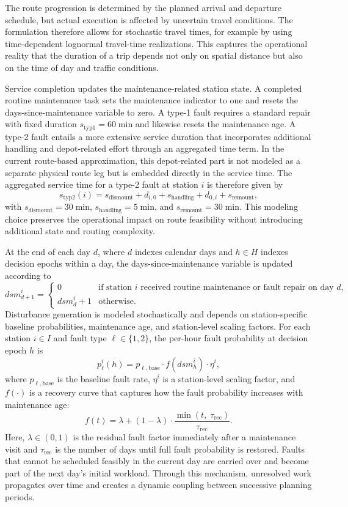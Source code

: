 \documentclass[12pt,oneside]{article}
\begin{document}
The route progression is determined by the planned arrival and departure schedule, but actual execution is affected by uncertain travel conditions. The formulation therefore allows for stochastic travel times, for example by using time-dependent lognormal travel-time realizations. This captures the operational reality that the duration of a trip depends not only on spatial distance but also on the time of day and traffic conditions.

Service completion updates the maintenance-related station state. A completed routine maintenance task sets the maintenance indicator to one and resets the days-since-maintenance variable to zero. A type-1 fault requires a standard repair with fixed duration $s_{\mathrm{typ1}} = 60\;\text{min}$ and likewise resets the maintenance age. A type-2 fault entails a more extensive service duration that incorporates additional handling and depot-related effort through an aggregated time term. In the current route-based approximation, this depot-related part is not modeled as a separate physical route leg but is embedded directly in the service time. The aggregated service time for a type-2 fault at station $i$ is therefore given by
\[
  s_{\mathrm{typ2}}(i) = s_{\mathrm{dismount}} + d_{i,0} + s_{\mathrm{handling}} + d_{0,i} + s_{\mathrm{remount}},
\]
with $s_{\mathrm{dismount}} = 30\;\text{min}$, $s_{\mathrm{handling}} = 5\;\text{min}$, and $s_{\mathrm{remount}} = 30\;\text{min}$. This modeling choice preserves the operational impact on route feasibility without introducing additional state and routing complexity.

At the end of each day $d$, where $d$ indexes calendar days and $h \in H$ indexes decision epochs within a day, the days-since-maintenance variable is updated according to
\[
  \mathit{dsm}_{d+1}^i =
  \begin{cases}
    0 & \text{if station } i \text{ received routine maintenance or fault repair on day } d, \\
    \mathit{dsm}_d^i + 1 & \text{otherwise.}
  \end{cases}
\]
Disturbance generation is modeled stochastically and depends on station-specific baseline probabilities, maintenance age, and station-level scaling factors. For each station $i \in I$ and fault type $\ell \in \{1, 2\}$, the per-hour fault probability at decision epoch $h$ is
\[
  p_\ell^i(h) = p_{\ell,\mathrm{base}} \cdot f\!\left(\mathit{dsm}_h^i\right) \cdot \eta^i,
\]
where $p_{\ell,\mathrm{base}}$ is the baseline fault rate, $\eta^i$ is a station-level scaling factor, and $f(\cdot)$ is a recovery curve that captures how the fault probability increases with maintenance age:
\[
  f(t) = \lambda + (1 - \lambda) \cdot \frac{\min(t,\;\tau_{\mathrm{rec}})}{\tau_{\mathrm{rec}}}.
\]
Here, $\lambda \in (0,1)$ is the residual fault factor immediately after a maintenance visit and $\tau_{\mathrm{rec}}$ is the number of days until full fault probability is restored. Faults that cannot be scheduled feasibly in the current day are carried over and become part of the next day’s initial workload. Through this mechanism, unresolved work propagates over time and creates a dynamic coupling between successive planning periods.
\end{document}
